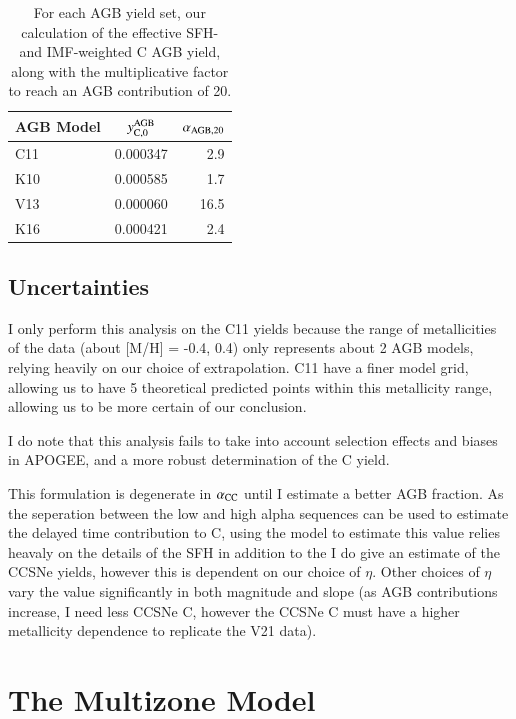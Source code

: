 \documentclass[12pt,oneside]{report}
\begin{document}
\begin{table}
	\centering
    \caption[AGB net solar IMF yields]{For each AGB yield set, our calculation of the effective SFH- and IMF-weighted C AGB yield, along with the multiplicative factor to reach an AGB contribution of 20.}
	\label{tab:alpha_agb}
	\begin{tabular}{lcr} %
		\toprule 
		AGB Model & $y_{\rm C, 0}^{\rm AGB}$ & $\alpha_{\rm AGB, 20}$\\
        \midrule
		C11 & 0.000347 & 2.9\\
		K10 & 0.000585 & 1.7\\
		V13 & 0.000060 & 16.5\\
		K16 & 0.000421 & 2.4\\
		\bottomrule
	\end{tabular}
\end{table}


\section{Uncertainties}

I only perform this analysis on the C11 yields because the range of metallicities of the data (about [M/H] = -0.4, 0.4) only represents about 2 AGB models, relying heavily on our choice of extrapolation. C11 have a finer model grid, allowing us to have 5 theoretical predicted points within this metallicity range, allowing us to be more certain of our conclusion. 

I do note that this analysis fails to take into account selection effects and biases in APOGEE, and a more robust determination of the C yield. 


This formulation is degenerate in $\alpha_{\rm CC}$ until I estimate a better AGB fraction. As the seperation between the low and high alpha sequences can be used to estimate the delayed time contribution to C, using the model to estimate this value relies heavaly on the details of the SFH in addition to the 
I do give an estimate of the CCSNe yields, however this is dependent on our choice of $\eta$. Other choices of $\eta$ vary the value significantly in both magnitude and slope (as AGB contributions increase, I need less CCSNe C, however the CCSNe C must have a higher metallicity dependence to replicate the V21 data). 



\chapter{The Multizone Model}\label{sec:vice}
\end{document}

